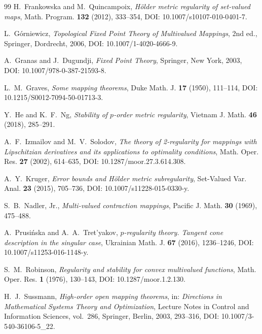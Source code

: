 \documentclass[11pt]{amsart}
\theoremstyle{definition}
\theoremstyle{remark}
\begin{document}
\begin{thebibliography}{99}
		H.~Frankowska and M.~Quincampoix,
		\emph{H\"older metric regularity of set-valued maps},
		Math. Program. \textbf{132} (2012), 333--354,
		DOI: 10.1007/s10107-010-0401-7.
		
		L.~G\'orniewicz,
		\emph{Topological Fixed Point Theory of Multivalued Mappings},
		2nd ed., Springer, Dordrecht, 2006,
		DOI: 10.1007/1-4020-4666-9.
		
		A.~Granas and J.~Dugundji,
		\emph{Fixed Point Theory},
		Springer, New York, 2003,
		DOI: 10.1007/978-0-387-21593-8.
		
		L.~M.~Graves,
		\emph{Some mapping theorems},
		Duke Math. J. \textbf{17} (1950), 111--114,
		DOI: 10.1215/S0012-7094-50-01713-3.
		
		Y.~He and K.~F.~Ng,
		\emph{Stability of $p$-order metric regularity},
		Vietnam J. Math. \textbf{46} (2018), 285--291.
		
		A.~F.~Izmailov and M.~V.~Solodov,
		\emph{The theory of 2-regularity for mappings with Lipschitzian derivatives
			and its applications to optimality conditions},
		Math. Oper. Res. \textbf{27} (2002), 614--635,
		DOI: 10.1287/moor.27.3.614.308.
		
		A.~Y.~Kruger,
		\emph{Error bounds and H\"older metric subregularity},
		Set-Valued Var. Anal. \textbf{23} (2015), 705--736,
		DOI: 10.1007/s11228-015-0330-y.
		
		S.~B.~Nadler, Jr.,
		\emph{Multi-valued contraction mappings},
		Pacific J. Math. \textbf{30} (1969), 475--488.
		
		A.~Prusi\'nska and A.~A.~Tret'yakov,
		\emph{$p$-regularity theory. Tangent cone description in the singular case},
		Ukrainian Math. J. \textbf{67} (2016), 1236--1246,
		DOI: 10.1007/s11253-016-1148-y.
		
		S.~M.~Robinson,
		\emph{Regularity and stability for convex multivalued functions},
		Math. Oper. Res. \textbf{1} (1976), 130--143,
		DOI: 10.1287/moor.1.2.130.
		
		H.~J.~Sussmann,
		\emph{High-order open mapping theorems},
		in: \emph{Directions in Mathematical Systems Theory and Optimization},
		Lecture Notes in Control and Information Sciences, vol.~286,
		Springer, Berlin, 2003, 293--316,
		DOI: 10.1007/3-540-36106-5\_22.
		

\end{thebibliography}
\end{document}

